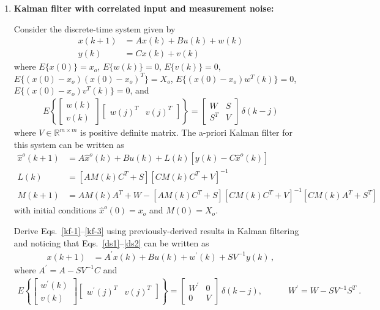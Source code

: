\documentclass[letterpaper,12pt]{article}
\begin{document}
\begin{enumerate}
\item
{\bf Kalman filter with correlated input and measurement noise:}

Consider the discrete-time system given by
\begin{align}
    x(k+1) & = A x(k) + B u(k) + w(k)
        \label{ds1} \\
    y(k) & = C x(k) + v(k)
        \label{ds2}
\end{align}
where $E \{x(0)\} = x_o$, $E\{ w(k) \} = 0$, $E\{v(k)\} = 0$, $E \{ (x(0) - x_o)(x(0) - x_o)^T \} = X_o$, $E\{ (x(0) - x_o) w^T(k) \} = 0$, $E \{(x(0) - x_o) v^T(k) \} = 0$, and
\begin{align*}
    E \left \{ \begin{bmatrix}
            w(k) \\
            v(k)
        \end{bmatrix} \begin{bmatrix}
            w(j)^T & v(j)^T
        \end{bmatrix} \right \} = \begin{bmatrix}
            W & S \\
            S^T & V
        \end{bmatrix} \, \delta(k-j)
\end{align*}
where $V \in \mathbb{R} ^{m \times m}$ is positive definite matrix. The a-priori Kalman filter for this system can be written as
\begin{align}
    \hat{x}^o(k+1) & = A \hat{x}^o(k) + B u(k) + L(k) [ y(k) - C \hat{x}^o(k) ]
        \label{kf-1} \\
    L(k) & = [ A M(k) C^T + S ] [ C M(k) C^T + V ] ^{-1}\\
    M(k+1) & = A M(k) A^T + W - [AM(k) C^T + S] [ C M(k) C^T + V ]^{-1} [CM(k) A^T + S^T]
        \label{kf-3}
\end{align}
with initial conditions $\hat{x}^o(0) = x_o$ and $M(0) = X_o$.

Derive Eqs.~\eqref{kf-1}--\eqref{kf-3} using previously-derived results in Kalman filtering and noticing that Eqs.~\eqref{ds1}--\eqref{ds2} can be written as
\begin{align*}
    x(k+1) & = A^{'} x(k) + B u(k) + w^{'}(k) + SV^{-1} y(k) \, ,
\end{align*}
where $A^{'} = A - SV^{-1}C$ and
\begin{align*}
    E \left \{ \begin{bmatrix}
            w^{'}(k) \\
            v(k)
        \end{bmatrix} \begin{bmatrix}
            w^{'}(j)^T & v(j)^T
        \end{bmatrix} \right \} = \begin{bmatrix}
            W^{'} & 0 \\
            0 & V
        \end{bmatrix} \, \delta(k-j),\hspace{3em}W^{'} = W - S V^{-1} S^T \; .
\end{align*}




\end{enumerate}
\end{document}
